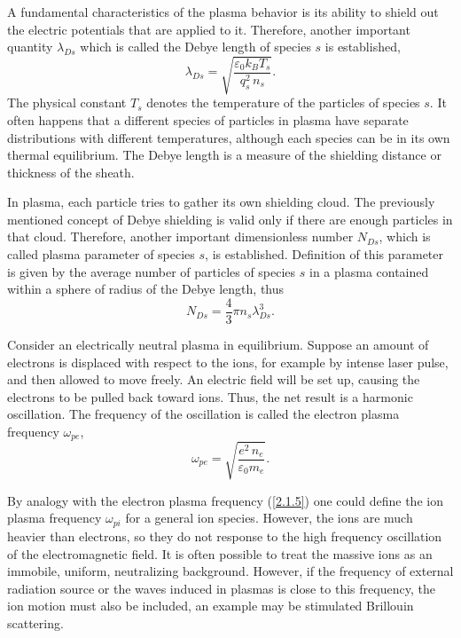 A fundamental characteristics of the plasma behavior is its ability to shield out the electric potentials that are applied to it. Therefore, another important quantity $ \lambda_{Ds} $ which is called the Debye length of species $ s $ is established,
\begin{equation}
\label{2.1.3}
\lambda_{Ds} = \sqrt{\frac{\varepsilon_0 k_B T_s}{q_s^2 \, n_s}}.
\end{equation}
The physical constant $ T_s $ denotes the temperature of the particles of species $ s $. It often happens that a different species of particles in plasma have separate distributions with different temperatures, although each species can be in its own thermal equilibrium. The Debye length is a measure of the shielding distance or thickness of the sheath.

In plasma, each particle tries to gather its own shielding cloud. The previously mentioned concept of Debye shielding is valid only if there are enough particles in that cloud. Therefore, another important dimensionless number $ N_{Ds} $, which is called plasma parameter of species $ s $, is established. Definition of this parameter is given by the average number of particles of species $ s $ in a plasma contained within a sphere of radius of the Debye length, thus
\begin{equation}
\label{2.1.4}
N_{Ds} = \frac{4}{3} \pi n_s \lambda_{Ds}^3. 
\end{equation}

Consider an electrically neutral plasma in equilibrium. Suppose an amount of electrons is displaced with respect to the ions, for example by intense laser pulse, and then allowed to move freely. An electric field will be set up, causing the electrons to be pulled back toward ions. Thus, the net result is a harmonic oscillation. The frequency of the oscillation is called the electron plasma frequency $ \omega_{pe} $,
\begin{equation}
\label{2.1.5}
\omega_{pe} = \sqrt{\frac{e^{2}\,n_e}{\varepsilon_0 m_e}}.
\end{equation}

By analogy with the electron plasma frequency (\ref{2.1.5}) one could define the ion plasma frequency $ \omega_{pi} $ for a general ion species. However, the ions are much heavier than electrons, so they do not response to the high frequency oscillation of the electromagnetic field. It is often possible to treat the massive ions as an immobile, uniform, neutralizing background. However, if the frequency of external radiation source or the waves induced in plasmas is close to this frequency, the ion motion must also be included, an example may be stimulated Brillouin scattering.

